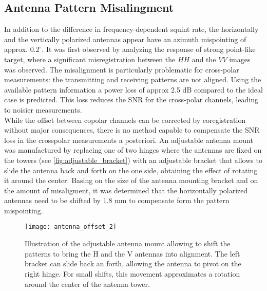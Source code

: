 \subsection{Antenna Pattern Misalingment}\label{sec:misalingment}
In addition to the difference in frequency-dependent squint rate, the horizontally and the vertically polarized antennas appear have an azimuth mispointing of approx. $0.2^\circ$. It was first observed by analyzing the response of strong point-like target, where a significant misregistration between the $HH$ and the $VV$ images was observed. The misalignment is particularly problematic for cross-polar measurements: the transmitting and receiving patterns are not aligned. Using the available pattern information a power loss of approx 2.5 dB  compared to the ideal case is predicted. This loss reduces the SNR for the cross-polar channels, leading to noisier measurements.\\ While the offset between copolar channels can be corrected by coregistration without major consequences, there is no method capable to compensate the SNR loss in the crosspolar measurements a posteriori. An adjustable antenna mount was manufactured by replacing one of two hinges where the antennas are fixed on the towers (see \autoref{fig:adjustable_bracket}) with an adjustable bracket that allows to slide the antenna back and forth on the one side, obtaining the effect of rotating it around the center. Basing on the size of the antenna mounting bracket and on the amount of misaligment, it was determined that the horizontally polarized antennas need to be shifted by 1.8 mm to compensate form the pattern mispointing.
\begin{figure}[ht]
	\centering
	\texttt{[image: antenna\_offset\_2]}
	\caption{Illustration of the adjustable antenna mount allowing to shift the patterns to bring the H and the V antennas into alignment. The left bracket can slide back an forth, allowing the antenna to pivot on the right hinge. For small shifts, this movement approximates a rotation around the center of the antenna tower.}
	\label{fig:adjustable_bracket}
\end{figure}
